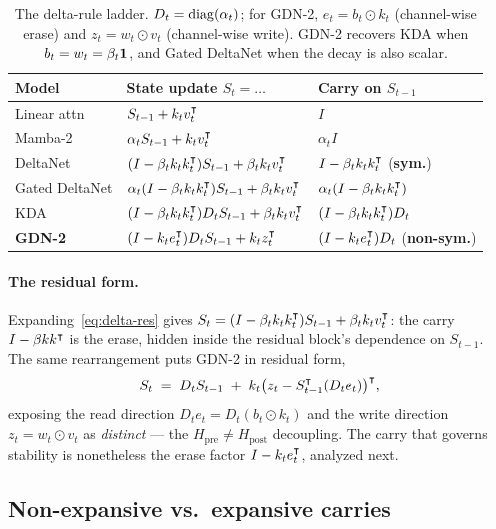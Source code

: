 \documentclass[11pt,letterpaper,logo]{yalearxiv}
\newcommand{\Hpre}{H_{\mathrm{pre}}}
\newcommand{\Hpost}{H_{\mathrm{post}}}
\begin{document}
\begin{table}[t]
\centering
\small
\begin{tabular}{@{}lll@{}}
\toprule
Model & State update $S_t=\dots$ & Carry on $S_{t-1}$ \\
\midrule
Linear attn & $S_{t-1} + k_t v_t^{\intercal}$ & $I$ \\
Mamba-2 & $\alpha_t S_{t-1} + k_t v_t^{\intercal}$ & $\alpha_t I$ \\
DeltaNet & $(I - \beta_t k_t k_t^{\intercal})S_{t-1} + \beta_t k_t v_t^{\intercal}$ & $I - \beta_t k_t k_t^{\intercal}$ (\textbf{sym.}) \\
Gated DeltaNet & $\alpha_t(I - \beta_t k_t k_t^{\intercal})S_{t-1} + \beta_t k_t v_t^{\intercal}$ & $\alpha_t(I - \beta_t k_t k_t^{\intercal})$ \\
KDA & $(I - \beta_t k_t k_t^{\intercal})D_t S_{t-1} + \beta_t k_t v_t^{\intercal}$ & $(I - \beta_t k_t k_t^{\intercal})D_t$ \\
\textbf{GDN-2} & $(I - k_t e_t^{\intercal})D_t S_{t-1} + k_t z_t^{\intercal}$ & $(I - k_t e_t^{\intercal})D_t$ (\textbf{non-sym.}) \\
\bottomrule
\end{tabular}
\caption{The delta-rule ladder. $D_t=\operatorname{diag}(\alpha_t)$; for GDN-2, $e_t = b_t \odot k_t$
(channel-wise erase) and $z_t = w_t \odot v_t$ (channel-wise write). GDN-2 recovers KDA
when $b_t = w_t = \beta_t \mathbf 1$, and Gated DeltaNet when the decay is also scalar.}
\label{tab:ladder}
\end{table}

\paragraph{The residual form.} Expanding~\eqref{eq:delta-res} gives
$S_t = (I - \beta_t k_t k_t^{\intercal})S_{t-1} + \beta_t k_t v_t^{\intercal}$: the carry
$I - \beta k k^{\intercal}$ is the erase, hidden inside the residual block's dependence on
$S_{t-1}$. The same rearrangement puts GDN-2 in residual form,
\begin{equation}
  S_t \;=\; D_t S_{t-1} \;+\; k_t\big(z_t - S_{t-1}^{\intercal}(D_t e_t)\big)^{\intercal},
  \label{eq:gdn2-res}
\end{equation}
exposing the read direction $D_t e_t = D_t(b_t \odot k_t)$ and the write direction
$z_t = w_t \odot v_t$ as \emph{distinct} --- the $\Hpre \neq \Hpost$ decoupling. The carry
that governs stability is nonetheless the erase factor $I - k_t e_t^{\intercal}$, analyzed next.

\subsection{Non-expansive vs.\ expansive carries}
\label{sec:sigmax}
\end{document}
